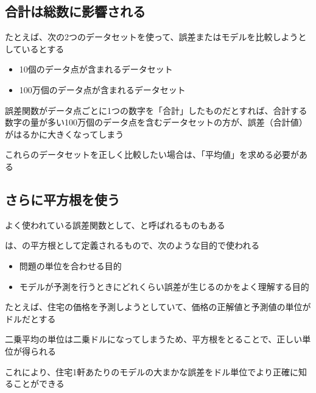 \documentclass[../../../topic_machine-learning]{subfiles}
\begin{document}
\subsection{合計は総数に影響される}

たとえば、次の2つのデータセットを使って、誤差またはモデルを比較しようとしているとする

\begin{itemize}
  \item 10個のデータ点が含まれるデータセット
  \item 100万個のデータ点が含まれるデータセット
\end{itemize}

誤差関数がデータ点ごとに1つの数字を「合計」したものだとすれば、合計する数字の量が多い100万個のデータ点を含むデータセットの方が、誤差（合計値）がはるかに大きくなってしまう

\br

これらのデータセットを正しく比較したい場合は、「平均値」を求める必要がある

\subsection{さらに平方根を使う}

よく使われている誤差関数として、と呼ばれるものもある

\br

は、の平方根として定義されるもので、次のような目的で使われる

\begin{itemize}
  \item 問題の単位を合わせる目的
  \item モデルが予測を行うときにどれくらい誤差が生じるのかをよく理解する目的
\end{itemize}

たとえば、住宅の価格を予測しようとしていて、価格の正解値と予測値の単位がドルだとする

二乗平均の単位は二乗ドルになってしまうため、平方根をとることで、正しい単位が得られる

これにより、住宅1軒あたりのモデルの大まかな誤差をドル単位でより正確に知ることができる
\end{document}
